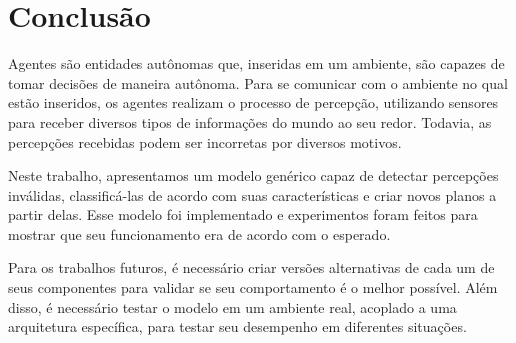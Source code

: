 \section{Conclusão}

Agentes são entidades autônomas que, inseridas em um ambiente, são capazes de tomar decisões de maneira autônoma. Para se comunicar com o ambiente no qual estão inseridos, os agentes realizam o processo de percepção, utilizando sensores para receber diversos tipos de informações do mundo ao seu redor. Todavia, as percepções recebidas podem ser incorretas por diversos motivos.

Neste trabalho, apresentamos um modelo genérico capaz de detectar percepções inválidas, classificá-las de acordo com suas características e criar novos planos a partir delas. Esse modelo foi implementado e experimentos foram feitos para mostrar que seu funcionamento era de acordo com o esperado.

Para os trabalhos futuros, é necessário criar versões alternativas de cada um de seus componentes para validar se seu comportamento é o melhor possível. Além disso, é necessário testar o modelo em um ambiente real, acoplado a uma arquitetura específica, para testar seu desempenho em diferentes situações.